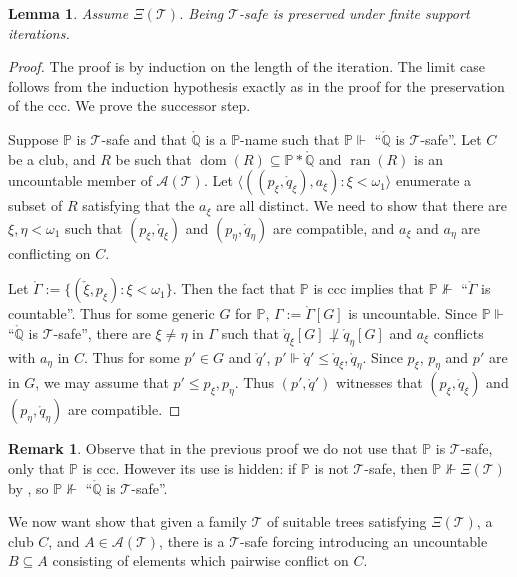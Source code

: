 \documentclass[10pt,a4paper]{amsart}
\newtheorem{lemma}[theorem]{Lemma}
\theoremstyle{definition}
\newtheorem{remark}[theorem]{Remark}
\renewcommand{\P}{\mathbb {P}}
\newcommand{\Q}{\mathbb{Q}}
\newcommand{\seb}{\subseteq}
\newcommand{\tup}[1]{\langle#1\rangle}
\newcommand{\dt}[1]{\mathring{#1}}
\newcommand{\forces}{\Vdash}
\newcommand{\ck}[1]{\check{#1}}
\newcommand{\1}{\mathbf{1}}
\newcommand{\T}{\mathcal{T}}
\newcommand{\prop}{\Xi}
\DeclareMathOperator{\dom}{dom}
\DeclareMathOperator{\ran}{ran}
\begin{document}
\begin{lemma}\label{lem:safe-iterations}
  Assume $\prop(\T)$.
  Being $\T$-safe is preserved under finite support iterations.
\end{lemma}
\begin{proof}
  The proof is by induction on the length of the iteration.
  The limit case follows from the induction hypothesis exactly as in
  the proof for the preservation of the ccc. We prove the successor step.
  
  Suppose $\P$ is $\T$-safe and that $\dt{\Q}$ is a $\P$-name such that
  $\P \forces$ ``$\dt{\Q}$ is $\T$-safe''. Let
  $C$ be a club, and $R$ be such that $\dom(R) \seb \P*\dt{\Q}$
  and $\ran(R)$ is an uncountable member of $\mathcal{A}(\T)$.
  Let $\tup{((p_{\xi},\dt{q}_{\xi}),a_{\xi} ) : \xi < \omega_{1}}$
  enumerate a subset of $R$ satisfying that the $a_{\xi}$ are all distinct.
  We need to show that there are $\xi,\eta < \omega_{1}$ such that
  $(p_{\xi},\dt{q}_{\xi})$ and $(p_{\eta},\dt{q}_{\eta})$ are compatible,
  and $a_{\xi}$ and $a_{\eta}$ are conflicting on $C$.

  Let
  $\dt{\Gamma} := \{(\ck{\xi},p_{\xi}) : \xi < \omega_{1}\}$. Then
  the fact that $\P$ is ccc implies that $\P \not\forces$ ``$\dt{\Gamma}$
  is countable''. Thus for some  generic $G$ for $\P$,
  $\Gamma := \dt{\Gamma}[G]$ is
  uncountable. Since $\P \forces$ ``$\dt{\Q}$ is $\T$-safe'',
  there are $\xi \neq \eta$ in $\Gamma$
  such that $\dt{q}_{\xi}[G] \not\perp \dt{q}_{\eta}[G]$
  and $a_{\xi}$ conflicts with $a_{\eta}$ in $C$.
  Thus for some  $p' \in G$ and $\dt{q}'$,
  $p' \forces \dt{q}' \le \dt{q}_{\xi},\dt{q}_{\eta}$. Since $p_{\xi}$,
  $p_{\eta}$ and $p'$ are in $G$, we may assume that
  $p' \le p_{\xi},p_{\eta}$. Thus $(p',\dt{q}')$ witnesses that
  $(p_{\xi},\dt{q}_{\xi})$ and $(p_{\eta},\dt{q}_{\eta})$ are compatible.
\end{proof}


\begin{remark}
  Observe that in the previous proof we do not use that $\P$ is
  $\T$-safe, only that $\P$ is ccc. However its use is hidden:
  if $\P$ is not
  $\T$-safe, then $\P \not\forces \prop(\T)$ by
  , so
  $\P \not\forces$ ``$\dt{\Q}$ is $\T$-safe''.
\end{remark}

We now want show that given a family $\T$ of suitable trees
satisfying $\prop(\T)$, a club $C$, and $A \in \mathcal{A}(\T)$, there
is a $\T$-safe forcing introducing an uncountable $B \seb A$
consisting of elements which pairwise conflict on $C$.
\end{document}

